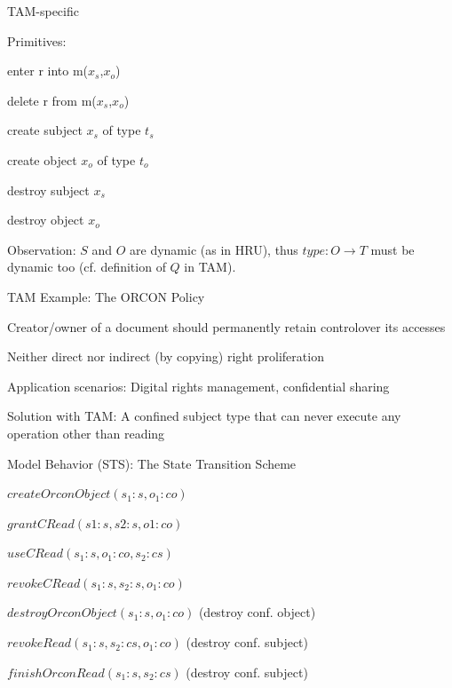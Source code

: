 \documentclass[a4paper]{article}
\begin{document}
\begin{multicols}{3}
    TAM-specific
    \begin{itemize*}
        \item Primitives:
        \begin{itemize*}
            \item enter r into m($x_s$,$x_o$)
            \item delete r from m($x_s$,$x_o$)
            \item create subject $x_s$ of type $t_s$
            \item create object $x_o$ of type $t_o$
            \item destroy subject $x_s$
            \item destroy object $x_o$
        \end{itemize*}
        \item Observation: $S$ and $O$ are dynamic (as in HRU), thus $type:O\rightarrow T$ must be dynamic too (cf. definition of $Q$ in TAM).
    \end{itemize*}

    TAM Example: The ORCON Policy
    \begin{itemize*}
        \item Creator/owner of a document should permanently retain controlover its accesses
        \item Neither direct nor indirect (by copying) right proliferation
        \item Application scenarios: Digital rights management, confidential sharing
        \item Solution with TAM: A confined subject type that can never execute any operation other than reading
    \end{itemize*}

    Model Behavior (STS): The State Transition Scheme
    \begin{itemize*}
        \item $createOrconObject(s_1:s, o_1:co)$
        \item $grantCRead(s 1 :s,s 2 :s,o 1 :co)$
        \item $useCRead(s_1:s, o_1:co, s_2:cs)$
        \item $revokeCRead(s_1:s, s_2:s, o_1:co)$
        \item $destroyOrconObject(s_1:s, o_1:co)$ (destroy conf. object)
        \item $revokeRead(s_1:s, s_2:cs, o_1:co)$ (destroy conf. subject)
        \item $finishOrconRead(s_1:s, s_2:cs)$ (destroy conf. subject)
    \end{itemize*}


\end{multicols}
\end{document}
